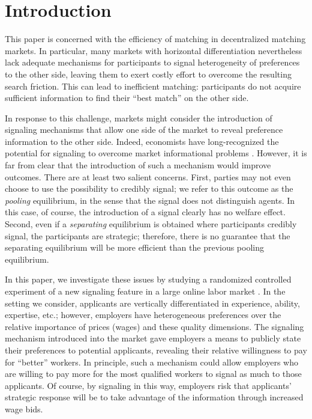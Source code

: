 \section{Introduction}

This paper is concerned with the efficiency of matching in decentralized matching markets.
In particular, many markets with horizontal differentiation nevertheless lack adequate mechanisms for participants to signal heterogeneity of preferences to the other side, leaving them to exert costly effort to overcome the resulting search friction.
This can lead to inefficient matching: participants do not acquire sufficient information to find their ``best match'' on the other side.

In response to this challenge, markets might consider the introduction of signaling mechanisms that allow one side of the market to reveal preference information to the other side.
Indeed, economists have long-recognized the potential for signaling to overcome market informational problems \citep{spence1973job, crawford1982strategic}.
However, it is far from clear that the introduction of such a mechanism would improve outcomes.  There are at least two salient concerns.
First, parties may not even choose to use the possibility to credibly signal; we refer to this outcome as the {\em pooling} equilibrium, in the sense that the signal does not distinguish agents.  In this case, of course, the introduction of a signal clearly has no welfare effect.
Second, even if a {\em separating} equilibrium is obtained where participants credibly signal, the participants are strategic; therefore, there is no guarantee that the separating equilibrium will be more efficient than the previous pooling equilibrium.  

In this paper, we investigate these issues by studying a randomized controlled experiment of a new signaling feature in a large online labor market \citep{Horton2010}.  In the setting we consider, applicants are vertically differentiated in experience, ability, expertise, etc.; however, employers have heterogeneous preferences over the relative importance of prices (wages) and these quality dimensions.  
The signaling mechanism introduced into the market gave employers a means to publicly state their preferences to potential applicants, revealing their relative willingness to pay for ``better'' workers.
In principle, such a mechanism could allow employers who are willing to pay more for the most qualified workers to signal as much to those applicants.
Of course, by signaling in this way, employers risk that applicants' strategic response will be to take advantage of the information through increased wage bids.

